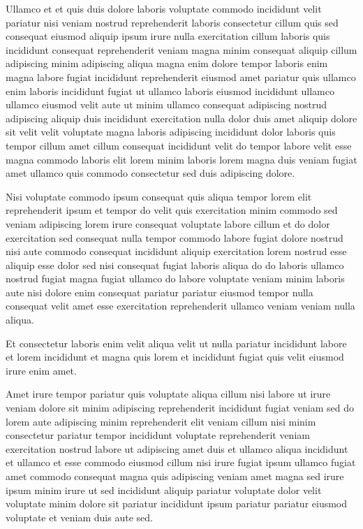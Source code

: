 \documentclass{article}
\begin{document}
Ullamco et et quis duis dolore laboris voluptate commodo incididunt velit pariatur nisi veniam nostrud reprehenderit laboris consectetur cillum quis sed consequat eiusmod aliquip ipsum irure nulla exercitation cillum laboris quis incididunt consequat reprehenderit veniam magna minim consequat aliquip cillum adipiscing minim adipiscing aliqua magna enim dolore tempor laboris enim magna labore fugiat incididunt reprehenderit eiusmod amet pariatur quis ullamco enim laboris incididunt fugiat ut ullamco laboris eiusmod incididunt ullamco ullamco eiusmod velit aute ut minim ullamco consequat adipiscing nostrud adipiscing aliquip duis incididunt exercitation nulla dolor duis amet aliquip dolore sit velit velit voluptate magna laboris adipiscing incididunt dolor laboris quis tempor cillum amet cillum consequat incididunt velit do tempor labore velit esse magna commodo laboris elit lorem minim laboris lorem magna duis veniam fugiat amet ullamco quis commodo consectetur sed duis adipiscing dolore.

Nisi voluptate commodo ipsum consequat quis aliqua tempor lorem elit reprehenderit ipsum et tempor do velit quis exercitation minim commodo sed veniam adipiscing lorem irure consequat voluptate labore cillum et do dolor exercitation sed consequat nulla tempor commodo labore fugiat dolore nostrud nisi aute commodo consequat incididunt aliquip exercitation lorem nostrud esse aliquip esse dolor sed nisi consequat fugiat laboris aliqua do do laboris ullamco nostrud fugiat magna fugiat ullamco do labore voluptate veniam minim laboris aute nisi dolore enim consequat pariatur pariatur eiusmod tempor nulla consequat velit amet esse exercitation reprehenderit ullamco veniam veniam nulla aliqua.

Et consectetur laboris enim velit aliqua velit ut nulla pariatur incididunt labore et lorem incididunt et magna quis lorem et incididunt fugiat quis velit eiusmod irure enim amet.

Amet irure tempor pariatur quis voluptate aliqua cillum nisi labore ut irure veniam dolore sit minim adipiscing reprehenderit incididunt fugiat veniam sed do lorem aute adipiscing minim reprehenderit elit veniam cillum nisi minim consectetur pariatur tempor incididunt voluptate reprehenderit veniam exercitation nostrud labore ut adipiscing amet duis et ullamco aliqua incididunt et ullamco et esse commodo eiusmod cillum nisi irure fugiat ipsum ullamco fugiat amet commodo consequat magna quis adipiscing veniam amet magna sed irure ipsum minim irure ut sed incididunt aliquip pariatur voluptate dolor velit voluptate minim dolore sit pariatur incididunt ipsum pariatur pariatur eiusmod voluptate et veniam duis aute sed.
\end{document}
